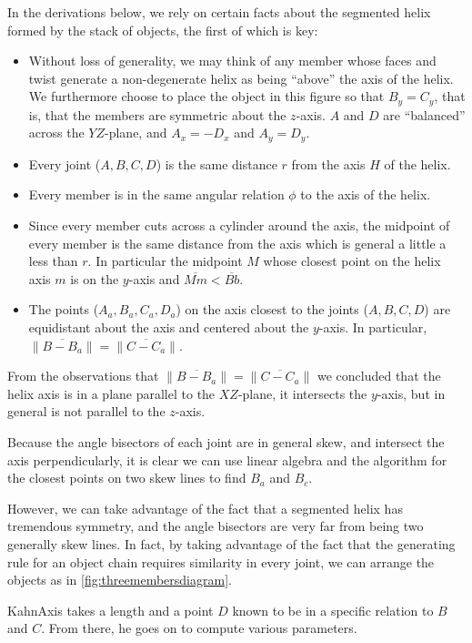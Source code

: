 \documentclass[11pt]{article}
\begin{document}
{In the derivations below, we rely on certain facts about
the segmented helix formed by the stack of objects, the first
of which is key:
\begin{itemize}
\item Without loss of generality, we may think of any member whose faces
  and twist generate a non-degenerate helix as being ``above'' the
  axis of the helix. We furthermore choose to place the object in
  this figure so that $B_y = C_y$, that is, that the members are symmetric
  about the $z$-axis.
  $A$ and $D$ are ``balanced'' across the $YZ$-plane,
  and $A_x = -D_x$ and $A_y = D_y$.
\item Every joint ($A,B,C,D$) is the same distance $r$ from the axis $H$ of the helix.
\item Every member is in the same angular relation $\phi$ to the axis of the helix.
\item Since every member cuts across a cylinder around the axis,
  the midpoint of every member is the same distance from the axis
  which is general a little a less than $r$. In particular the midpoint $M$
  whose closest point on the helix axis $m$ is on the $y$-axis and
  $\overline{Mm} < \overline{Bb}$.
\item The points ($A_a,B_a,C_a,D_a$) on the axis closest to the joints ($A,B,C,D$)
  are equidistant about the axis and centered about the $y$-axis. In
  particular, $\| \overline{B - B_a} \| = \| \overline{C - C_a} \|$.
\end{itemize}

From the observations that $\| \overline{B - B_a} \| = \| \overline{C - C_a} \|$
we concluded that the helix axis is in a plane
parallel to the $XZ$-plane, it intersects the $y$-axis, but in general is
not parallel to the $z$-axis. 

Because the angle bisectors of each joint are in general skew, and intersect the
axis perpendicularly, it is clear we can use linear algebra and the algorithm
for the closest points on two skew lines to find $B_a$ and $B_c$.

However, we can take advantage of the fact that a segmented helix has
tremendous symmetry, and the angle bisectors are very far from being two
generally skew lines. In fact, by taking advantage of the fact that the
generating rule for an object chain requires similarity in every joint,
we can arrange the objects as in \ref{fig:threemembersdiagram}.

KahnAxis takes a length and a point $D$ known to be in
a specific relation to $B$ and $C$. 
From there, he goes on to compute various parameters.

}
\end{document}
